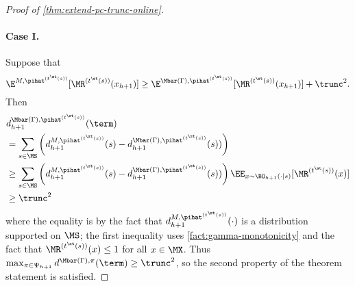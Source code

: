 \begin{proof}[Proof of \cref{thm:extend-pc-trunc-online}]
\paragraph{Case I.} Suppose that 
\[\E^{M,\pihat^{(t^\st(s))}}[\MR^{(t^\st(s))}(x_{h+1})] \geq \E^{\Mbar(\Gamma),\pihat^{(t^\st(s))}}[\MR^{(t^\st(s))}(x_{h+1})] + \trunc^2.\]
Then
\begin{align*}
&d^{\Mbar(\Gamma),\pihat^{(t^\st(s))}}_{h+1}(\term) \\ 
&= \sum_{s \in \MS} \left(d^{M,\pihat^{(t^\st(s))}}_{h+1}(s) - d^{\Mbar(\Gamma),\pihat^{(t^\st(s))}}_{h+1}(s))\right) \\ 
&\geq \sum_{s \in \MS} \left(d^{M,\pihat^{(t^\st(s))}}_{h+1}(s) - d^{\Mbar(\Gamma),\pihat^{(t^\st(s))}}_{h+1}(s))\right) \EE_{x\sim\BO_{h+1}(\cdot|s)}[\MR^{(t^\st(s))}(x)] \\ 
&\geq \trunc^2
\end{align*}
where the equality is by the fact that $d^{M,\pihat^{(t^\st(s))}}_{h+1}(\cdot)$ is a distribution supported on $\MS$; the first inequality uses \cref{fact:gamma-monotonicity} and the fact that $\MR^{(t^\st(s))}(x) \leq 1$ for all $x \in \MX$. Thus $\max_{\pi\in\Psi_{h+1}} d^{\Mbar(\Gamma),\pi}(\term) \geq \trunc^2$, so the second property of the theorem statement is satisfied.


\end{proof}
